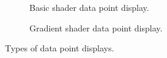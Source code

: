 
\begin{figure}[H]
	\captionsetup[subfigure]{aboveskip=-0.8em,belowskip=0.5em}
	\newcommand{\figurewidth}{0.5\textwidth}
	\begin{subfigure}[b]{\figurewidth}
		\caption{Basic shader data point display.}
		\label{fig:basic_shader}
	\end{subfigure}
	\begin{subfigure}[b]{\figurewidth}
		\caption{Gradient shader data point display.}
		\label{fig:gradient_shader}
	\end{subfigure}
	\caption[Data point display types]{Types of data point displays.}
	\label{fig:data_point_displays}
\end{figure}
